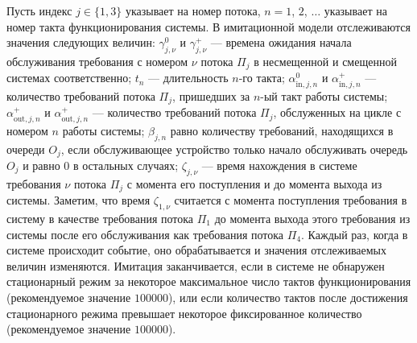 \documentclass[a4paper,12pt,russian]{extarticle}
\begin{document}
Пусть индекс $j\in \{1, 3\}$  указывает на номер потока, $n=1$, $2$, $\ldots$ указывает на номер такта функционирования системы.
 В имитационной модели отслеживаются значения следующих величин: $\gamma_{j,\nu}^0$ и $\gamma_{j,\nu}^+$ --- времена ожидания начала обслуживания требования с номером $\nu$ потока $\Pi_j$ в несмещенной и смещенной системах соответственно; $t_n$ --- длительность $n$-го такта;
 $\alpha^{0}_{\text{in}, j,n}$ и $\alpha^{+}_{\text{in},j,n}$  --- количество требований потока $\Pi_j$, пришедших за $n$-ый такт работы системы; 
 $\alpha^{+}_{\text{out},j,n}$ и $\alpha^{+}_{\text{out},j,n}$ --- количество требований потока $\Pi_j$, обслуженных на цикле с номером $n$ работы системы;  $\beta_{j,n}$ равно количеству требований, находящихся в очереди $O_j$, если обслуживающее устройство только начало обслуживать очередь $O_j$ и равно $0$ в остальных случаях; $\zeta_{j,\nu}$ --- время нахождения в системе требования $\nu$ потока $\Pi_j$ с момента его поступления и до момента выхода из системы. Заметим, что время $\zeta_{1,\nu}$ считается с момента поступления требования в систему в качестве требования потока $\Pi_1$ до момента выхода этого требования из системы после его обслуживания как требования потока $\Pi_4$.
 Каждый раз, когда в системе происходит событие, оно обрабатывается и значения отслеживаемых величин изменяются. Имитация заканчивается, 
 если в системе не обнаружен стационарный режим за некоторое максимальное число тактов функционирования (рекомендуемое значение $100000$), или если количество тактов после достижения стационарного режима превышает некоторое фиксированное количество (рекомендуемое значение $100000$).
\end{document}
